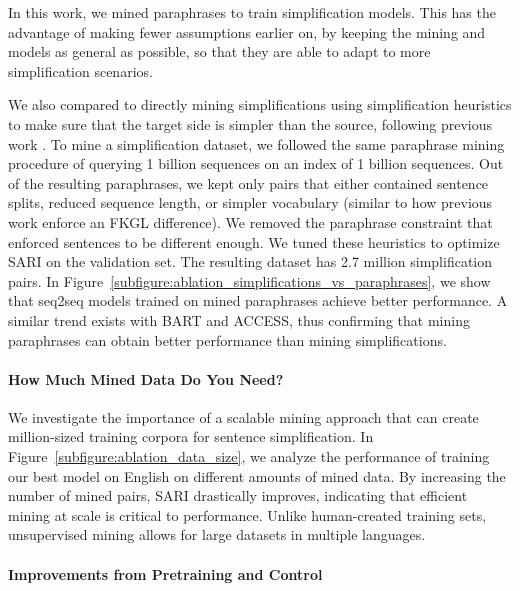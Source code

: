 \documentclass[11pt]{article}
\newcommand{\bart}{\textsc{BART}\xspace}
\newcommand{\access}{\mbox{\textsc{ACCESS}}\xspace}
\begin{document}
In this work, we mined paraphrases to train simplification models. This has the advantage of making fewer assumptions earlier on, by keeping the mining and models as general as possible, so that they are able to adapt to more simplification scenarios.

We also compared to directly mining simplifications using simplification heuristics to make sure that the target side is simpler than the source, following previous work \cite{kajiwara-komachi-2016-building,surya2018unsupervised}.
To mine a simplification dataset, we followed the same paraphrase mining procedure of querying 1 billion sequences on an index of 1 billion sequences. Out of the resulting paraphrases, we kept only pairs that either contained sentence splits, reduced sequence length, or simpler vocabulary (similar to how previous work enforce an FKGL difference). We removed the paraphrase constraint that enforced sentences to be different enough. We tuned these heuristics to optimize SARI on the validation set. The resulting dataset has 2.7 million simplification pairs.
In Figure~\ref{subfigure:ablation_simplifications_vs_paraphrases}, we show that seq2seq models trained on mined paraphrases achieve better performance. A similar trend exists with \bart and \access, thus confirming that mining paraphrases can obtain better performance than mining simplifications.


\paragraph{How Much Mined Data Do You Need?} 

We investigate the importance of a scalable mining approach that can create million-sized training corpora for sentence simplification. In Figure~\ref{subfigure:ablation_data_size}, we analyze the performance of training our best model on English on different amounts of mined data. By increasing the number of mined pairs, SARI drastically improves, indicating that efficient mining at scale is critical to performance. Unlike human-created training sets, unsupervised mining allows for large datasets in multiple languages. 








\paragraph{Improvements from Pretraining and Control}
\end{document}
